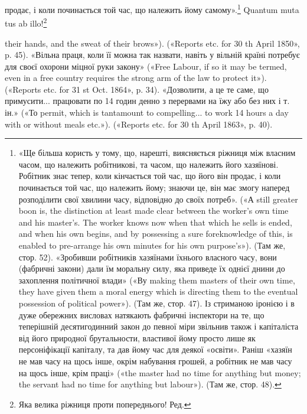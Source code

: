 продає, і коли починається той час, що належить йому самому».\footnote{
«Ще більша користь у тому, що, нарешті, виясняється ріжниця
між власним часом, що належить робітникові, та часом, що належить
його хазяїнові. Робітник знає тепер, коли кінчається той час, що його
він продає, і коли починається той час, що належить йому; знаючи це,
він має змогу наперед розподілити свої хвилини часу, відповідно до своїх
потреб». («А still greater boon is, the distinction at least made clear between
the worker’s own time and his master’s. The worker knows now when
that which he sells is ended, and when his own begins, and by possessing a sure
foreknowledge of this, is enabled to pre-arrange his own minutes for his
own purpose’s»). (Там же, стор. 52). «Зробивши робітників хазяїнами
їхнього власного часу, вони (фабричні закони) дали їм моральну силу,
яка приведе їх однієї днини до захоплення політичної влади» («Ву
making them masters of their own time, they have given them a moral energy
which is directing them to the eventual possession of political power»).
(Там же, стор. 47). Із стриманою іронією і в дуже обережних висловах
натякають фабричні інспектори на те, що теперішній десятигодинний
закон до певної міри звільнив також і капіталіста від його природної
брутальности, властивої йому просто лише як персоніфікації капіталу, та
дав йому час для деякої «освіти». Раніш «хазяїн не мав часу на щось
інше, окрім набування грошей, а робітник не мав часу на щось інше,
крім праці» («the master had no time for anything but money; the servant
had no time for anything but labour»). (Там же, стор. 48).
}
Quantum muta tus ab illo!\footnote*{
Яка велика ріжниця проти попереднього! Ред.
}

their hands, and the sweat of their brows»). («Reports etc. for 30 th April
1850», p. 45). «Вільна праця, коли її можна так назвати, навіть у вільній
країні потребує для своєї охорони міцної руки закону» («Free Labour,
if so it may be termed, even in a free country requires the strong arm of
the law to protect it»). («Reports etc. for 31 st Oct. 1864», p. 34). «Дозволити,
а це те саме, що примусити... працювати по 14 годин денно з перервами
на їжу або без них і т. ін.» («То permit, which is tantamount to
compelling... to work 14 hours a day with or without meals etc.»). («Reports
etc. for 30 th April 1863», p. 40).
